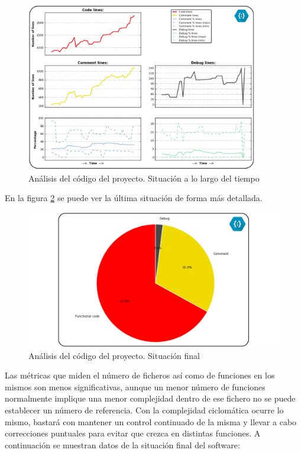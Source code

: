     \begin{figure}[H]
        \centering
        \includegraphics[width=0.9\textwidth]{figuras/Imagenes_SW/code_analysis.jpg}
        \caption{Análisis del código del proyecto. Situación a lo largo del tiempo}
        \label{fig:SW:code_analysis}
    \end{figure}

    En la figura \ref{fig:SW:quesito} se puede ver la última situación de forma más detallada.

    \begin{figure}[H]
    	\centering
    	\includegraphics[width=\textwidth]{figuras/Imagenes_SW/quesito_final.jpg}
    	\caption{Análisis del código del proyecto. Situación final}
    	\label{fig:SW:quesito}
    \end{figure}

    Las métricas que miden el número de ficheros así como de funciones en los mismos son menos significativas, aunque un menor número de funciones normalmente implique una menor complejidad dentro de ese fichero no se puede establecer un número de referencia. Con la complejidad ciclomática ocurre lo mismo, bastará con mantener un control continuado de la misma y llevar a cabo correcciones puntuales para evitar que crezca en distintas funciones. A continuación se muestran datos de la situación final del software:

